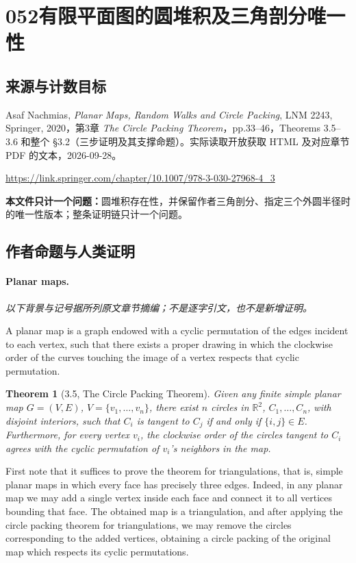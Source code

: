 \documentclass[UTF8,11pt]{ctexart}
\newtheorem*{theorem}{Theorem}
\theoremstyle{definition}
\newcommand{\R}{\mathbb R}
\begin{document}
\section*{052\quad 有限平面图的圆堆积及三角剖分唯一性}
\subsection*{来源与计数目标}
Asaf Nachmias, \emph{Planar Maps, Random Walks and Circle Packing}, LNM 2243, Springer, 2020，第3章 \emph{The Circle Packing Theorem}，pp.33--46，Theorems 3.5--3.6 和整个 \S3.2（三步证明及其支撑命题）。实际读取开放获取 HTML 及对应章节 PDF 的文本，2026-09-28。
\par\url{https://link.springer.com/chapter/10.1007/978-3-030-27968-4_3}
\par\textbf{本文件只计一个问题：}圆堆积存在性，并保留作者三角剖分、指定三个外圆半径时的唯一性版本；整条证明链只计一个问题。
\subsection*{作者命题与人类证明}
\paragraph{Planar maps.}
\noindent\textit{以下背景与记号据所列原文章节摘编；不是逐字引文，也不是新增证明。}\par
A planar map is a graph endowed with a cyclic permutation of the edges incident to each vertex, such that there exists a proper drawing in which the clockwise order of the curves touching the image of a vertex respects that cyclic permutation.

\begin{theorem}[3.5, The Circle Packing Theorem]
Given any finite simple planar map $G=(V,E)$, $V=\{v_1,\ldots,v_n\}$, there exist $n$ circles in $\R^2$, $C_1,\ldots,C_n$, with disjoint interiors, such that $C_i$ is tangent to $C_j$ if and only if $\{i,j\}\in E$. Furthermore, for every vertex $v_i$, the clockwise order of the circles tangent to $C_i$ agrees with the cyclic permutation of $v_i$'s neighbors in the map.
\end{theorem}
First note that it suffices to prove the theorem for triangulations, that is, simple planar maps in which every face has precisely three edges. Indeed, in any planar map we may add a single vertex inside each face and connect it to all vertices bounding that face. The obtained map is a triangulation, and after applying the circle packing theorem for triangulations, we may remove the circles corresponding to the added vertices, obtaining a circle packing of the original map which respects its cyclic permutations.
\end{document}
